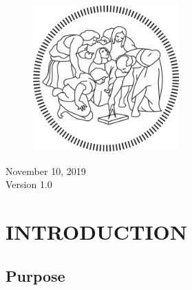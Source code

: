 \documentclass[a4paper]{article}
\begin{document}
\begin{titlepage}
	
	\vfill\vfill\vfill
	
	\begin{figure}[H]
	\centering
	\includegraphics[width=0.5\textwidth]{polimi_logo}
	\end{figure}
	
	
	\vfill\vfill\vfill
	
	{\large November 10, 2019\\ Version 1.0} %
	
	\vfill
	
\end{titlepage}


\newpage
{}

\tableofcontents

\newpage
{}

\section{INTRODUCTION}\label{introduction}

\subsection{Purpose}
\end{document}
